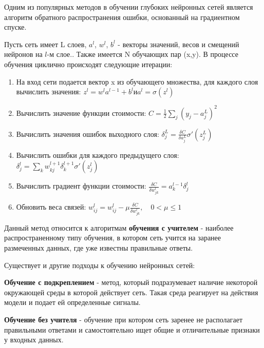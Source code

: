  

Одним из популярных методов в обучении глубоких нейронных сетей является алгоритм обратного распространения ошибки, основанный на градиентном спуске. 

Пусть сеть имеет L слоев, $a^l$, $w_{}^l$, $b^l$ - векторы значений, весов и смещений нейронов на $l$-м слое.. Также имеется N обучающих пар (x,y). 
В процессе обучения циклично происходят следующие итерации: 

\begin{enumerate}
    \item На вход сети подается вектор x из обучающего множества, для каждого слоя вычислить значения: \hfill $z^l = w^la^{l-1}+b^l и a^l = \sigma(z^l)$
    \item Вычислить значение функции стоимости: \hfill $C = \frac{1}{2}\sum_j{(y_j-a_j^L)^2}$
    \item Вычислить значения ошибок выходного слоя: \hfill $\delta_j^L=\frac{\delta C}{\delta a_j^L}\sigma'(z_j^L)$
    \item Вычислить ошибки для каждого предыдущего слоя: \hfill $\delta_j^l=\sum_k{w_{kj}^{l+1} \delta_k^{l+1}\sigma'(z_j^l)}$
    \item Вычислить градиент функции стоимости: \hfill $\frac{\delta C}{\delta w_{jk}^l} = a_k^{l-1} \delta_j^l$ %
    \item Обновить веса связей: \hfill $w_{ij}^l=w_{ij}^l-\mu\frac{\delta C}{\delta w_{jk}^l},\hspace{1em} 0<\mu \leqslant 1$
\end{enumerate}


Данный метод относится к алгоритмам \textbf{обучения с учителем} - наиболее распространенному типу обучения, в котором сеть учится на заранее размеченных данных, где уже известны правильные ответы.

Существует и другие подходы к обучению нейронных сетей:

\textbf{Обучение с подкреплением} - метод, который подразумевает наличие некоторой окружающей среды в которой действует сеть. Такая среда реагирует на действия модели и подает ей определенные сигналы.  

\textbf{Обучение без учителя} - обучение при котором сеть заренее не располагает правильными ответами и самостоятельно ищет общие и отличительные признаки у входных данных. 

